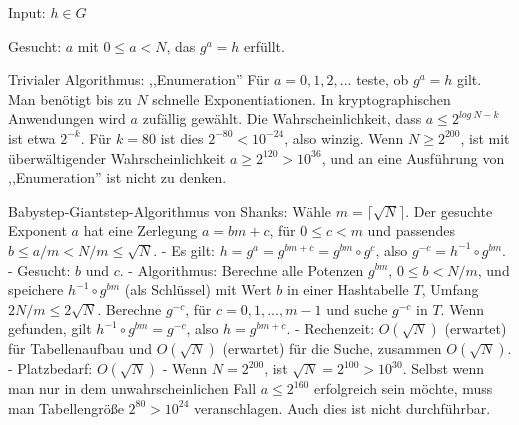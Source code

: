 \documentclass[a4paper]{article}
\begin{document}
\begin{multicols}{3}
{{{{            Input: $h\in G$

            Gesucht: $a$ mit $0\leq a<N$, das $g^a=h$ erfüllt.

            Trivialer Algorithmus: ,,Enumeration''
            Für $a=0,1,2 ,...$ teste, ob $g^a=h$ gilt. Man benötigt bis zu $N$ schnelle Exponentiationen. In kryptographischen Anwendungen wird $a$ zufällig gewählt. Die Wahrscheinlichkeit, dass $a\leq 2^{log\ N-k}$ ist etwa $2^{-k}$. Für $k= 80$ ist dies $2^{-80}< 10^{-24}$, also winzig. Wenn $N\geq 2^{200}$, ist mit überwältigender Wahrscheinlichkeit $a\geq 2^{120}> 10^{36}$, und an eine Ausführung von ,,Enumeration'' ist nicht zu denken.

            Babystep-Giantstep-Algorithmus von Shanks:
            Wähle $m=\lceil \sqrt{N}\rceil$. Der gesuchte Exponent $a$ hat eine Zerlegung $a=bm+c$, für $0\leq c < m$ und passendes $b\leq a/m < N/m\leq \sqrt{N}$.
            - Es gilt: $h=g^a=g^{bm+c}=g^{bm} \circ g^c$, also $g^{-c}=h^{-1}\circ g^{bm}$.
            - Gesucht: $b$ und $c$.
            - Algorithmus: Berechne alle Potenzen $g^{bm}$, $0\leq b < N/m$, und speichere $h^{-1}\circ g^{bm}$ (als Schlüssel) mit Wert $b$ in einer Hashtabelle $T$, Umfang $2N/m\leq 2\sqrt{N}$. Berechne $g^{-c}$, für $c=0,1,...,m-1$ und suche $g^{-c}$ in $T$. Wenn gefunden, gilt $h^{-1} \circ g^{bm}=g^{-c}$, also $h=g^{bm+c}$.
            - Rechenzeit: $O(\sqrt{N})$ (erwartet) für Tabellenaufbau und $O(\sqrt{N})$ (erwartet) für die Suche, zusammen $O(\sqrt{N})$.
            - Platzbedarf: $O(\sqrt{N})$
            - Wenn $N=2^{200}$, ist $\sqrt{N}= 2^{100}> 10^{30}$. Selbst wenn man nur in dem unwahrscheinlichen Fall $a\leq 2^{160}$ erfolgreich sein möchte, muss man Tabellengröße $2^{80}> 10^{24}$ veranschlagen. Auch dies ist nicht durchführbar.

}}}}
\end{multicols}
\end{document}
